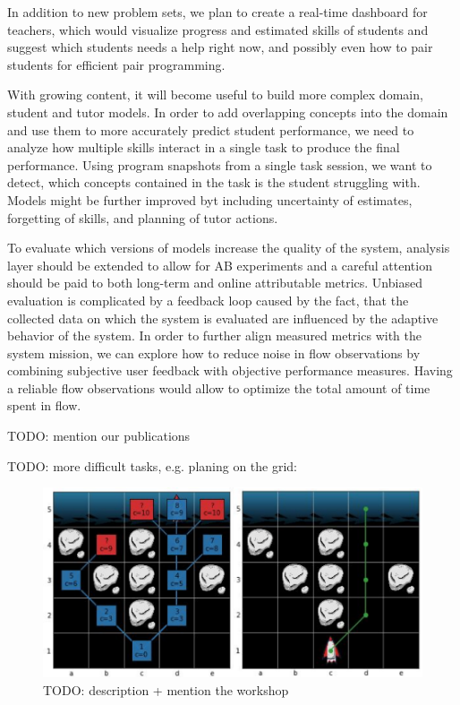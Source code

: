 In addition to new problem sets, we plan to create a real-time dashboard for teachers,
which would visualize progress and estimated skills of students and suggest
which students needs a help right now, and possibly even how to pair students
for efficient pair programming.

With growing content, it will become useful to build more complex
domain, student and tutor models. In order to add overlapping concepts
into the domain and use them to more accurately predict student performance,
we need to analyze how multiple skills interact in a single
task to produce the final performance. %
Using program snapshots from a single task session,
we want to detect, which concepts contained in the task
is the student struggling with.
Models might be further improved byt including uncertainty of estimates,
forgetting of skills, and planning of tutor actions.

To evaluate which versions of models increase the quality of the system,
analysis layer should be extended to allow for AB experiments
and a careful attention should be paid to both long-term and
online attributable metrics.
Unbiased evaluation is complicated by a feedback loop caused by the fact, that
the collected data on which the system is evaluated are influenced by the
adaptive behavior of the system.
In order to further align measured metrics with the system mission,
we can explore how to reduce noise in flow observations
by combining subjective user feedback with objective performance measures.
Having a reliable flow observations would allow to optimize the total
amount of time spent in flow.



TODO: mention our publications

TODO: more difficult tasks, e.g. planing on the grid:

\begin{figure}[htb]
\centering
\includegraphics[width=\textwidth]{img/robomission-search-tree}
\caption{%
  TODO: description + mention the workshop}
\label{fig:robomission-search-tree}
\end{figure}
